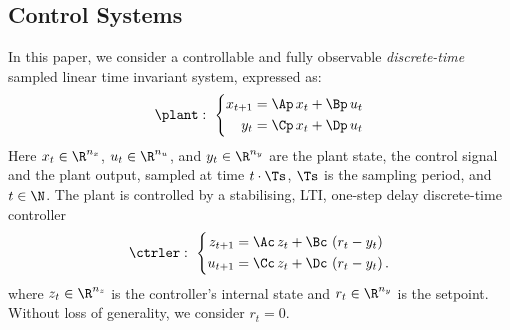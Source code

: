 \subsection{Control Systems}
\label{ssec:systemmodel}
In this paper, we consider a controllable and fully observable \emph{discrete-time} sampled linear time invariant system, expressed as:
%
\begin{equation}
    \label{eq:plant}
    \plant: \,\, \left\{
    \begin{aligned}
        x_{t+1} &= \Ap\,x_t + \Bp\,u_t \\
        y_{t} &= \Cp\,x_t + \Dp\,u_t
    \end{aligned}
    \right.
\end{equation}
%
Here $x_t\in\R^{n_x}$, $u_t\in\R^{n_u}$, and $y_t\in\R^{n_y}$ are the plant state, the control signal and the plant output, sampled at time $t\cdot \Ts$, $\Ts$ is the sampling period, and $t\in\N$.
The plant is controlled by a stabilising, LTI, one-step delay discrete-time controller
%
\begin{equation}
    \label{eq:controller}
    \ctrler: \,\, \left\{
    \begin{aligned}
        z_{t+1} &= \Ac\,z_t + \Bc\,\left(r_t - y_t\right) \\
        u_{t+1} &= \Cc\,z_t + \Dc\,\left(r_t - y_t\right).
    \end{aligned}
    \right.
\end{equation}
%
where $z_t\in\R^{n_z}$ is the controller's internal state and $r_t\in\R^{n_y}$ is the setpoint.
Without loss of generality, we consider $r_t = 0$.

